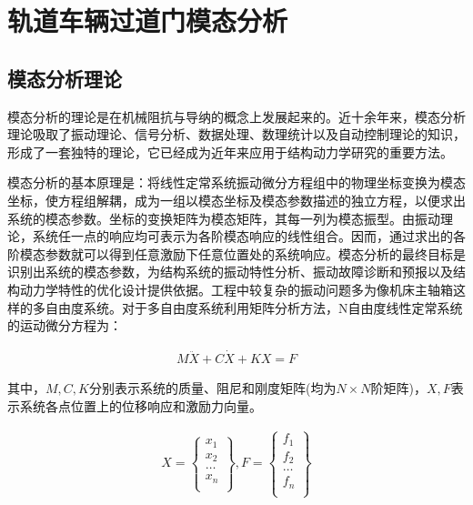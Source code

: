 \section{轨道车辆过道门模态分析}
\subsection{模态分析理论}

模态分析的理论是在机械阻抗与导纳的概念上发展起来的。近十余年来，模态分析理论吸取了振动理论、信号分析、数据处理、数理统计以及自动控制理论的知识，形成了一套独特的理论，它已经成为近年来应用于结构动力学研究的重要方法。

模态分析的基本原理是：将线性定常系统振动微分方程组中的物理坐标变换为模态坐标，使方程组解耦，成为一组以模态坐标及模态参数描述的独立方程，以便求出系统的模态参数。坐标的变换矩阵为模态矩阵，其每一列为模态振型。由振动理论，系统任一点的响应均可表示为各阶模态响应的线性组合。因而，通过求出的各阶模态参数就可以得到任意激励下任意位置处的系统响应。模态分析的最终目标是识别出系统的模态参数，为结构系统的振动特性分析、振动故障诊断和预报以及结构动力学特性的优化设计提供依据。工程中较复杂的振动问题多为像机床主轴箱这样的多自由度系统。对于多自由度系统利用矩阵分析方法，N自由度线性定常系统的运动微分方程为：

\begin{eqnarray}
    M\ddot{X}+C\dot{X}+KX=F
\end{eqnarray}

其中，$M,C,K$分别表示系统的质量、阻尼和刚度矩阵(均为$N\times{N}$阶矩阵)，$X,F$表示系统各点位置上的位移响应和激励力向量。

\begin{eqnarray}
    X=\left\{
        \begin{array}{c}
            x_{1}\\
            x_{2}\\
            \dots\\
            x_{n}\\
        \end{array}
    \right\},
    F=\left\{
        \begin{array}{c}
            f_{1}\\
            f_{2}\\
            \dots\\
            f_{n}\\
        \end{array}
    \right\}
\end{eqnarray}